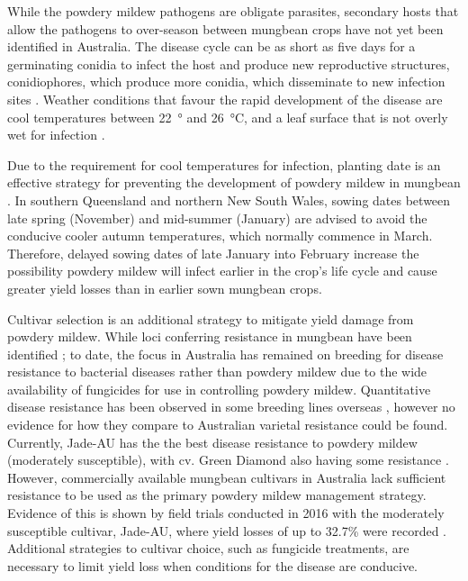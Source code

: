\documentclass[agronomy,article,submit,moreauthors,pdftex]{mdpi}
\begin{document}
While the powdery mildew pathogens are obligate parasites, secondary hosts that allow the pathogens to over-season between mungbean crops have not yet been identified in Australia.
The disease cycle can be as short as five days for a germinating conidia to infect the host and produce new reproductive structures, conidiophores, which produce more conidia, which disseminate to new infection sites \citep{Sparks2017}.
Weather conditions that favour the rapid development of the disease are cool temperatures between 22~° and 26~°C, and a leaf surface that is not overly wet for infection \citep{Kelly2017a}.

Due to the requirement for cool temperatures for infection, planting date is an effective strategy for preventing the development of powdery mildew in mungbean \citep{AMAplanting}.
In southern Queensland and northern New South Wales, sowing dates between late spring (November) and mid-summer (January) are advised to avoid the conducive cooler autumn temperatures, which normally commence in March.
Therefore, delayed sowing dates of late January into February increase the possibility powdery mildew will infect earlier in the crop's life cycle and cause greater yield losses than in earlier sown mungbean crops.

Cultivar selection is an additional strategy to mitigate yield damage from powdery mildew.
While loci conferring resistance in mungbean have been identified \citep{Humphry2003, Zhang2008}; to date, the focus in Australia has remained on breeding for disease resistance to bacterial diseases rather than powdery mildew due to the wide availability of fungicides for use in controlling powdery mildew.
Quantitative disease resistance has been observed in some breeding lines overseas \citep{Pandey2018, Chankaew2013}, however no evidence for how they compare to Australian varietal resistance could be found.
Currently, Jade-AU has the the best disease resistance to powdery mildew (moderately susceptible), with cv. Green Diamond also having some resistance \citep{Sparks2017}.
However, commercially available mungbean cultivars in Australia lack sufficient resistance to be used as the primary powdery mildew management strategy.
Evidence of this is shown by field trials conducted in 2016 with the moderately susceptible cultivar, Jade-AU, where yield losses of up to 32.7\% were recorded \citep{SueThompson2016}.
Additional strategies to cultivar choice, such as fungicide treatments, are necessary to limit yield loss when conditions for the disease are conducive.
\end{document}
